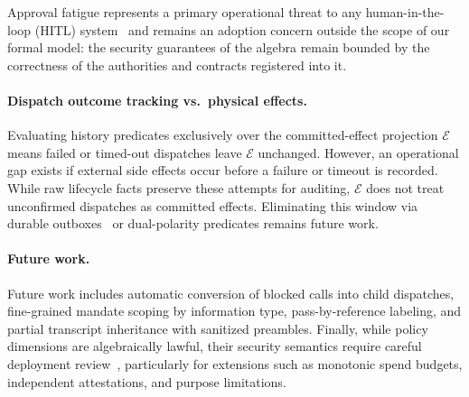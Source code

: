 Approval fatigue represents a primary operational threat to any human-in-the-loop (HITL) system~\cite{akhawe2013alice} and remains an adoption concern outside the scope of our formal model: the security guarantees of the algebra remain bounded by the correctness of the authorities and contracts registered into it.

\paragraph{Dispatch outcome tracking vs.\ physical effects.}
Evaluating history predicates exclusively over the committed-effect projection $\mathcal{E}$ means failed or timed-out dispatches leave $\mathcal{E}$ unchanged. However, an operational gap exists if external side effects occur before a failure or timeout is recorded. While raw lifecycle facts preserve these attempts for auditing, $\mathcal{E}$ does not treat unconfirmed dispatches as committed effects. Eliminating this window via durable outboxes~\cite{richardson2018microservices} or dual-polarity predicates remains future work.

\paragraph{Future work.}
Future work includes automatic conversion of blocked calls into child dispatches, fine-grained mandate scoping by information type, pass-by-reference labeling, and partial transcript inheritance with sanitized preambles. Finally, while policy dimensions are algebraically lawful, their security semantics require careful deployment review~\cite{claessen2000quickcheck}, particularly for extensions such as monotonic spend budgets, independent attestations, and purpose limitations.
